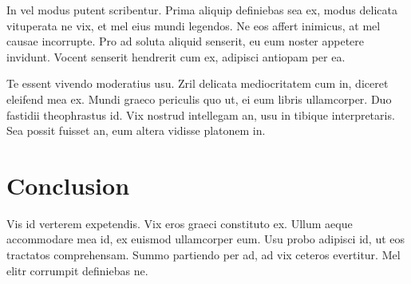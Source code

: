 \documentclass[letterpaper]{article}
\begin{document}
In vel modus putent scribentur. Prima aliquip definiebas sea ex, modus delicata vituperata ne vix, et mel eius mundi legendos. Ne eos affert inimicus, at mel causae incorrupte. Pro ad soluta aliquid senserit, eu eum noster appetere invidunt. Vocent senserit hendrerit cum ex, adipisci antiopam per ea.

Te essent vivendo moderatius usu. Zril delicata mediocritatem cum in, diceret eleifend mea ex. Mundi graeco periculis quo ut, ei eum libris ullamcorper. Duo fastidii theophrastus id. Vix nostrud intellegam an, usu in tibique interpretaris. Sea possit fuisset an, eum altera vidisse platonem in.

\section{Conclusion}
Vis id verterem expetendis. Vix eros graeci constituto ex. Ullum aeque accommodare mea id, ex euismod ullamcorper eum. Usu probo adipisci id, ut eos tractatos comprehensam. Summo partiendo per ad, ad vix ceteros evertitur. Mel elitr corrumpit definiebas ne.

%
%

\printbibliography
\end{document}
